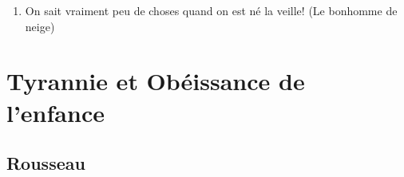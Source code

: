 \documentclass[a4paper, 11pt, hidelinks]{article}
\begin{document}
\begin{enumerate}
    \item On sait vraiment peu de choses quand on est né la veille! (Le bonhomme de neige)
\end{enumerate}














































\section{Tyrannie et Obéissance de l'enfance}



\subsection{Rousseau}
\end{document}
